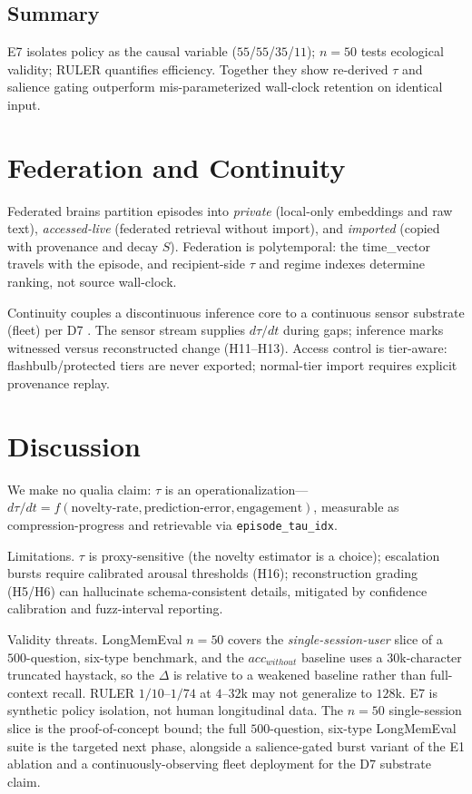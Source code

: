 \documentclass[letterpaper]{article}
\begin{document}
\subsection{Summary}
E7 isolates policy as the causal variable ($55$/$55$/$35$/$11$); $n{=}50$ tests ecological validity; RULER quantifies efficiency. Together they show re-derived $\tau$ and salience gating outperform mis-parameterized wall-clock retention on identical input.

\section{Federation and Continuity}
Federated brains partition episodes into \emph{private} (local-only embeddings and raw text), \emph{accessed-live} (federated retrieval without import), and \emph{imported} (copied with provenance and decay $S$). Federation is polytemporal: the time\_vector travels with the episode, and recipient-side $\tau$ and regime indexes determine ranking, not source wall-clock.

Continuity couples a discontinuous inference core to a continuous sensor substrate (fleet) per D7 \citep{james1890principles,bergson1889duree}. The sensor stream supplies $d\tau/dt$ during gaps; inference marks witnessed versus reconstructed change (H11--H13). Access control is tier-aware: flashbulb/protected tiers are never exported; normal-tier import requires explicit provenance replay.

\section{Discussion}
We make no qualia claim: $\tau$ is an operationalization---$d\tau/dt=f(\text{novelty-rate},\text{prediction-error},\text{engagement})$, measurable as compression-progress \citep{schmidhuber1991curiosity} and retrievable via \texttt{episode\_tau\_idx}.

Limitations. $\tau$ is proxy-sensitive (the novelty estimator is a choice); escalation bursts require calibrated arousal thresholds (H16); reconstruction grading (H5/H6) can hallucinate schema-consistent details, mitigated by confidence calibration and fuzz-interval reporting.

Validity threats. LongMemEval $n{=}50$ covers the \emph{single-session-user} slice of a $500$-question, six-type benchmark, and the $acc_{without}$ baseline uses a $30$k-character truncated haystack, so the $\Delta$ is relative to a weakened baseline rather than full-context recall. RULER $1/10$--$1/74$ at $4$--$32$k may not generalize to $128$k. E7 is synthetic policy isolation, not human longitudinal data. The $n{=}50$ single-session slice is the proof-of-concept bound; the full $500$-question, six-type LongMemEval suite is the targeted next phase, alongside a salience-gated burst variant of the E1 ablation and a continuously-observing fleet deployment for the D7 substrate claim.
\end{document}
